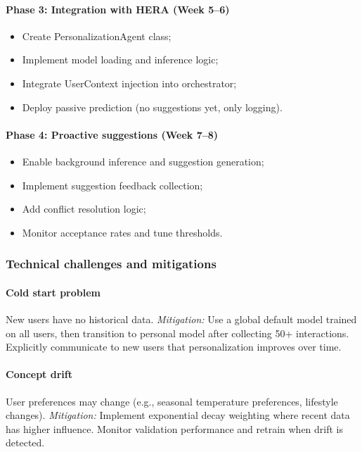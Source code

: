 \paragraph{Phase 3: Integration with HERA (Week 5--6)}
\begin{itemize}
    \item Create PersonalizationAgent class;
    \item Implement model loading and inference logic;
    \item Integrate UserContext injection into orchestrator;
    \item Deploy passive prediction (no suggestions yet, only logging).
\end{itemize}

\paragraph{Phase 4: Proactive suggestions (Week 7--8)}
\begin{itemize}
    \item Enable background inference and suggestion generation;
    \item Implement suggestion feedback collection;
    \item Add conflict resolution logic;
    \item Monitor acceptance rates and tune thresholds.
\end{itemize}

\subsubsection{Technical challenges and mitigations}

\paragraph{Cold start problem}
New users have no historical data. \emph{Mitigation:} Use a global
default model trained on all users, then transition to personal model
after collecting 50+ interactions. Explicitly communicate to new users
that personalization improves over time.

\paragraph{Concept drift}
User preferences may change (e.g., seasonal temperature preferences,
lifestyle changes). \emph{Mitigation:} Implement exponential decay
weighting where recent data has higher influence. Monitor validation
performance and retrain when drift is detected.

